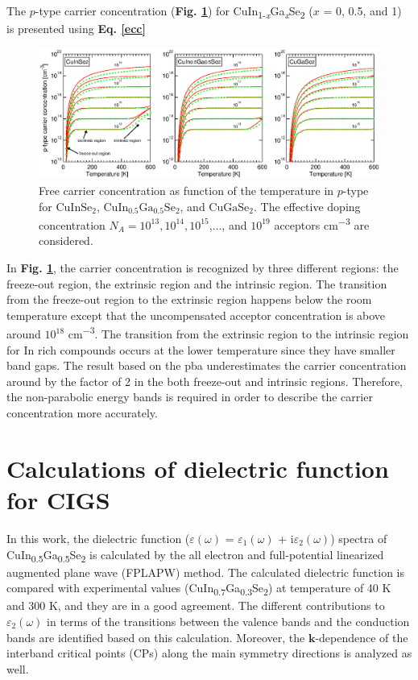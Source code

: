 \documentclass[a4paper, 12pt, titlepage,oneside,drop]{kthesis}
\begin{document}
The $p$-type carrier concentration (\textbf{Fig. \ref{ptypecc}}) for {CuIn\textsubscript{1-\textit{x}}Ga\textsubscript{\textit{x}}Se\textsubscript{2}} ($x$ = 0, 0.5, and 1) is presented using \textbf{Eq. \ref{ecc}}

 \begin{figure}[H]
    \begin{center}
            \includegraphics[width=1\textwidth,clip]{paper2figure9}
     \end{center}
    \caption{Free carrier concentration as function of the temperature in $p$-type for $\mathrm{CuInSe_2}$, $\mathrm{CuIn_{0.5}Ga_{0.5}Se_2}$, and $\mathrm{CuGaSe_2}$.
    The effective doping concentration $N_A = 10^{13}, 10^{14}, 10^{15}$,..., and  $10^{19}$ acceptors cm\textsuperscript{$-$3} are considered.}
   \label{ptypecc}
\end{figure}

In \textbf{Fig. \ref{ptypecc}}, the carrier concentration is recognized by three different regions: the freeze-out region, the extrinsic region and the intrinsic region. The 
transition from the freeze-out region to the extrinsic region happens below the room temperature except that the uncompensated acceptor concentration is above around 
$10^{18}$ cm\textsuperscript{$-$3}. The transition from the extrinsic region to the intrinsic region for In rich compounds occurs at the lower temperature since they have smaller band gaps.
The result based on the pba underestimates the carrier concentration around by the factor of 2 in the both freeze-out and intrinsic regions. Therefore, the 
non-parabolic energy bands is required in order to describe the carrier concentration more accurately.


\section{Calculations of dielectric function for CIGS}
In this work, the dielectric function ($\varepsilon (\omega)$ = $\varepsilon_1 (\omega)$ + i$\varepsilon_2 (\omega)$) spectra of CuIn\textsubscript{0.5}Ga\textsubscript{0.5}Se\textsubscript{2} is calculated by the all electron
and full-potential linearized augmented plane wave (FPLAPW) method. The calculated dielectric function is compared with experimental values (CuIn\textsubscript{0.7}Ga\textsubscript{0.3}Se\textsubscript{2}) at temperature 
of 40 K and 300 K, and they are in a good agreement. The different contributions to $\varepsilon_2(\omega)$ in terms of the transitions between the valence bands and the conduction bands are identified based on this calculation.
Moreover, the $\textbf{k}$-dependence of the interband critical points (CPs) along the main symmetry directions is analyzed as well.
\end{document}

